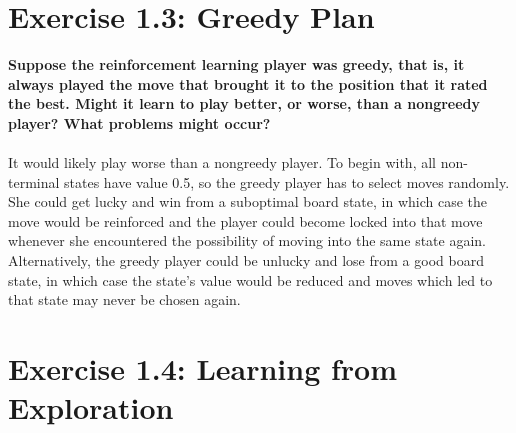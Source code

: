 \documentclass[a4paper,11pt]{article}
\numberwithin{equation}{section}
\theoremstyle{remark}
\begin{document}
\section{Exercise 1.3: Greedy Plan}

\textbf{Suppose the reinforcement learning player was greedy, that is, it always played the move that brought it to the position that it rated the best. Might it learn to play better, or worse, than a nongreedy player? What problems might occur?}
\\ \\
It would likely play worse than a nongreedy player. To begin with, all non-terminal states have value 0.5, so the greedy player has to select moves randomly. She could get lucky and win from a suboptimal board state, in which case the move would be reinforced and the player could become locked into that move whenever she encountered the possibility of moving into the same state again. Alternatively, the greedy player could be unlucky and lose from a good board state, in which case the state's value would be reduced and moves which led to that state may never be chosen again.


\section{Exercise 1.4: Learning from Exploration}
\end{document}
